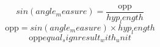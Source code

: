 \[sin({angle_measure})=\frac{\text{{{opp}}}}{{{hyp_length}}}\]
\[\text{{{opp}}}=sin({angle_measure})\times {hyp_length}\]
\[\text{{{opp}}}{equal_sign}{result_with_unit}\]
